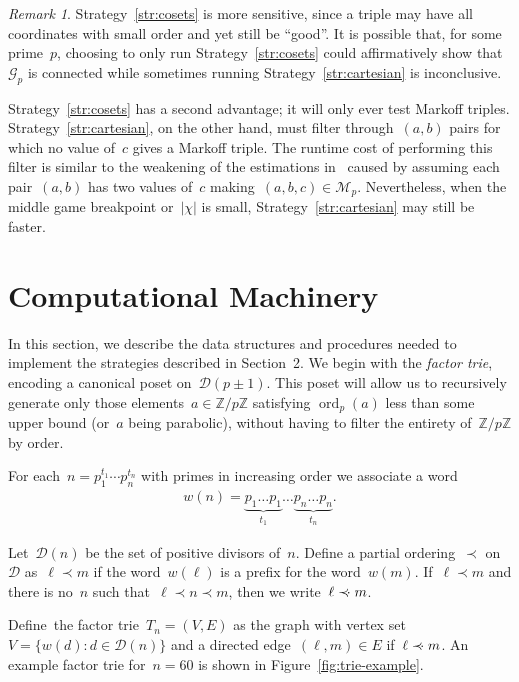 \documentclass{article}
\newcommand{\precdot}{\prec\mathrel{\mkern-3mu}\mathrel{\cdot}}
\DeclareMathOperator{\ord}{ord}
\theoremstyle{definition}
\theoremstyle{remark}
\newtheorem{remark}{Remark}
\begin{document}
\begin{remark}
    Strategy~\ref{str:cosets} is more sensitive, since a triple may have all coordinates with small order and yet still be ``good''.
    It is possible that, for some prime~$p$, choosing to only run Strategy~\ref{str:cosets} could affirmatively show that~$\mathcal{G}_p$ is connected while sometimes running Strategy~\ref{str:cartesian} is inconclusive.

    Strategy~\ref{str:cosets} has a second advantage; it will only ever test Markoff triples.
    Strategy~\ref{str:cartesian}, on the other hand, must filter through~$(a, b)$ pairs for which no value of~$c$ gives a Markoff triple.
    The runtime cost of performing this filter is similar to the weakening of the estimations in~\cite{fuchs} caused by assuming each pair~$(a, b)$ has two values of~$c$ making~$(a, b, c) \in \mathcal{M}_p$.
    Nevertheless, when the middle game breakpoint or~$|\chi|$ is small, Strategy~\ref{str:cartesian} may still be faster.
\end{remark}

\section{Computational Machinery}

In this section, we describe the data structures and procedures needed to implement the strategies described in Section~2.
We begin with the \textit{factor trie}, encoding a canonical poset on~$\mathcal{D}(p \pm 1)$.
This poset will allow us to recursively generate only those elements~$a \in \mathbb{Z} / p\mathbb{Z}$ satisfying $\ord_p(a)$ less than some upper bound (or~$a$ being parabolic), without having to filter the entirety of~$\mathbb{Z} / p\mathbb{Z}$ by order.

For each~$n = p_1^{t_1} \cdots p_n^{t_n}$ with primes in increasing order we associate a word
\begin{align}
    w(n) = \underbrace{p_1 \ldots p_1}_{t_1} \ldots \underbrace{p_n \ldots p_n}_{t_n}. \label{eq:word}
\end{align}

Let~$\mathcal{D}(n)$ be the set of positive divisors of~$n$.
Define a partial ordering~$\prec$ on~$\mathcal{D}$ as~$\ell \prec m$ if the word~$w(\ell)$ is a prefix for the word~$w(m)$.
If~$\ell \prec m$ and there is no~$n$ such that~$\ell \prec n \prec m$, then we write~$\ell \precdot m$.

Define\footnotemark\ the factor trie~$T_n = (V, E)$ as the graph with vertex set~$V = \{w(d) : d \in \mathcal{D}(n)\}$ and a directed edge~$(\ell, m) \in E$ if~$\ell \precdot m$.
%
An example factor trie for~$n = 60$ is shown in Figure~\ref{fig:trie-example}.
\end{document}
